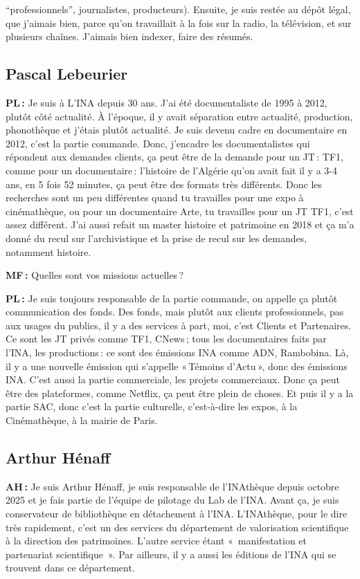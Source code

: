 “professionnels”, journalistes, producteurs). Ensuite, je suis restée au dépôt légal, que j'aimais bien, parce qu'on travaillait à la fois sur la radio, la télévision, et sur plusieurs chaînes. J'aimais bien indexer, faire des résumés.

\subsection*{Pascal Lebeurier}

\textbf{PL :} Je suis à L’INA depuis 30 ans. J'ai été documentaliste de 1995 à 2012, plutôt côté actualité. À l'époque, il y avait séparation entre actualité, production, phonothèque et j'étais plutôt actualité. Je suis devenu cadre en documentaire en 2012, c'est la partie commande. Donc, j'encadre les documentalistes qui répondent aux demandes clients, ça peut être de la demande pour un JT : TF1, comme pour un documentaire : l'histoire de l'Algérie qu'on avait fait il y a 3-4 ans, en 5 fois 52 minutes, ça peut être des formats très différents. Donc les recherches sont un peu différentes quand tu travailles pour une expo à cinémathèque, ou pour un documentaire Arte, tu travailles pour un JT TF1, c'est assez différent. J'ai aussi refait un master histoire et patrimoine en 2018 et ça m'a donné du recul sur l'archivistique et la prise de recul sur les demandes, notamment histoire. 

\textbf{MF :} Quelles sont vos missions actuelles ?  

\textbf{PL :} Je suis toujours responsable de la partie commande, on appelle ça plutôt communication des fonds.  Des fonds, mais plutôt aux clients professionnels, pas aux usages du publics, il y a des services à part, moi, c'est Clients et Partenaires. Ce sont les JT privés comme TF1, CNews ; tous les documentaires faits par l'INA, les productions : ce sont des émissions INA comme ADN, Rambobina. Là, il y a une nouvelle émission qui s'appelle « Témoins d'Actu », donc des émissions INA. C'est aussi la partie commerciale, les projets commerciaux. Donc ça peut être des plateformes, comme Netflix, ça peut être plein de choses. Et puis il y a la partie SAC, donc c'est la partie culturelle, c'est-à-dire les expos, à la Cinémathèque, à la mairie de Paris.  

\subsection*{Arthur Hénaff}

\textbf{AH :} Je suis Arthur Hénaff, je suis responsable de l'INAthèque depuis octobre 2025 et je fais partie de l'équipe de pilotage du Lab de l'INA. Avant ça, je suis conservateur de bibliothèque en détachement à l'INA. L'INAthèque, pour le dire très rapidement, c'est un des services du département de valorisation scientifique à la direction des patrimoines. L'autre service étant « manifestation et partenariat scientifique ». Par ailleurs, il y a aussi les éditions de l'INA qui se trouvent dans ce département.

